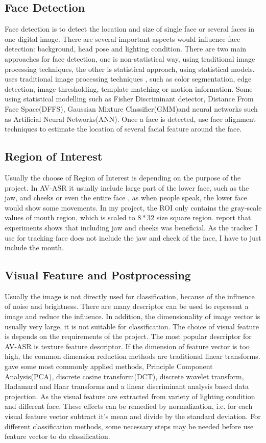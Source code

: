 \subsection{Face Detection}
Face detection is to detect the location and size of single face or several faces in one digital image. There are several important aspects would influence face detection: background, head pose and lighting condition. There are two main approaches for face detection, one is non-statistical way, using traditional image processing techniques, the other is statistical approach, using statistical models. \cite{potamianos2003recent} uses traditional image processing techniques , such as color segmentation, edge detection, image thresholding, template matching or motion information. Some using statistical modelling such as Fisher Discriminant detector, Distance From Face Space(DFFS), Gaussian Mixture Classifier(GMM)and neural networks such as Artificial Neural Networks(ANN). Once a face is detected, use face alignment techniques to estimate the location of several facial feature around the face.
\subsection{Region of Interest}
Usually the choose of Region of Interest is depending on the purpose of the project. In AV-ASR it usually include large part of the lower face, such as the jaw, and cheeks or even the entire face \cite{potamianos2003recent}, as when people speak, the lower face would show some movements. In my project, the ROI only contains the gray-scale values of mouth region, which is scaled to $8 * 32$ size square region. \cite{potamianos2003recent} report that experiments shows that including jaw and cheeks was beneficial. As the tracker I use for tracking face does not include the jaw and cheek of the face, I have to just include the mouth.
\subsection{Visual Feature and Postprocessing}
Usually the image is not directly used for classification, because of the influence of noise and brightness. There are many descriptor can be used to represent a image and reduce the influence. In addition, the dimensionality of image vector is usually very large, it is not suitable for classification. The choice of visual feature is depends on the requirements of the project. The most popular descriptor for AV-ASR is texture feature descriptor. If the dimension of feature vector is too high, the common dimension reduction methods are traditional linear transforms. \cite{potamianos2003recent} gave some most commonly applied methods, Principle Component Analysis(PCA), discrete cosine transform(DCT), discrete wavelet transform, Hadamard and Haar transforms and a linear discriminant analysis based data projection. As the visual feature are extracted from variety of lighting condition and different face. These effects can be remedied by normalization, i.e. for each visual feature vector subtract it's mean and divide by the standard deviation. For different classification methods, some necessary steps may be needed before use feature vector to do classification.
